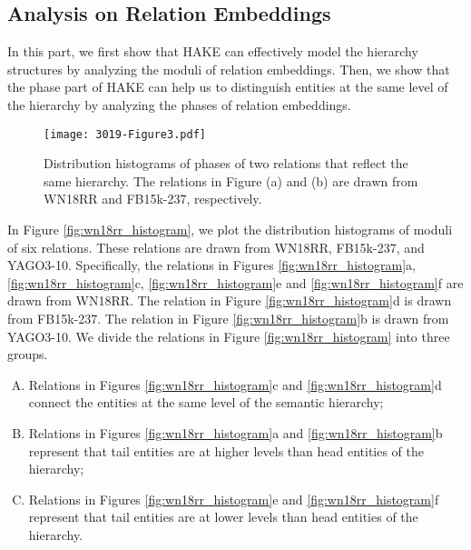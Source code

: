 \documentclass[letterpaper]{article} \usepackage{aaai20}  \usepackage{times}  \usepackage{helvet} \usepackage{courier}  \usepackage[hyphens]{url}  \usepackage{graphicx} \urlstyle{rm} \def\UrlFont{\rm}  \usepackage{graphicx}  \frenchspacing  \setlength{\pdfpagewidth}{8.5in}  \setlength{\pdfpageheight}{11in}
\begin{document}
\subsection{Analysis on Relation Embeddings}
In this part, we first show that HAKE can effectively model the hierarchy structures by analyzing the moduli of relation embeddings. Then, we show that the phase part of HAKE can help us to distinguish entities at the same level of the hierarchy by analyzing the phases of relation embeddings. 


\begin{figure}[!ht]
    \centering \texttt{[image: 3019-Figure3.pdf]}
\caption{Distribution histograms of phases of two relations that reflect the same hierarchy. The relations in Figure (a) and (b) are drawn from WN18RR and FB15k-237, respectively.}
\label{fig:phase_hist}
\end{figure}


In Figure \ref{fig:wn18rr_histogram}, we plot the distribution histograms of moduli of six relations. These relations are drawn from WN18RR, FB15k-237, and YAGO3-10. Specifically, the relations in Figures \ref{fig:wn18rr_histogram}a, \ref{fig:wn18rr_histogram}c, \ref{fig:wn18rr_histogram}e and \ref{fig:wn18rr_histogram}f  are drawn from WN18RR. The relation in Figure \ref{fig:wn18rr_histogram}d is drawn from FB15k-237. The relation in Figure \ref{fig:wn18rr_histogram}b is drawn from YAGO3-10. We divide the relations in Figure \ref{fig:wn18rr_histogram} into three groups.
\begin{enumerate}[(A)]
    \item Relations in Figures \ref{fig:wn18rr_histogram}c and \ref{fig:wn18rr_histogram}d
connect the entities at the same level of the semantic hierarchy;
    \item Relations in Figures \ref{fig:wn18rr_histogram}a and \ref{fig:wn18rr_histogram}b
represent that tail entities are at higher levels than head entities of the hierarchy;
    \item Relations in Figures \ref{fig:wn18rr_histogram}e and \ref{fig:wn18rr_histogram}f
represent that tail entities are at lower levels than head entities of the hierarchy.
\end{enumerate}
\end{document}
